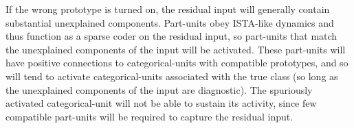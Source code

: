 \documentclass{article} %
\begin{document}


\begin{comment}
If only a single prototype is active (enforced by winner-take-all connections after convergence, as in figure~\ref{categorical_connection_figure}(b)), and all active part-units have orthogonal decoders that are either within or orthogonal to the tangent space (with equal negative connections from the orthogonal units), 
then the weighted sum of negative projections from the part units to the selected categorical-unit is the $\ell_1$ tangent distance.  %
This is actually close to the current network (FINISH).
\end{comment}

If the wrong prototype is turned on, the residual input will generally contain substantial unexplained components.  Part-units obey ISTA-like dynamics and thus function as a sparse coder on the residual input, so part-units that match the unexplained components of the input will be activated.  These part-units will have positive connections to categorical-units with compatible prototypes, and so will tend to activate categorical-units associated with the true class (so long as the unexplained components of the input are diagnostic).  The spuriously activated categorical-unit will not be able to sustain its activity, since few compatible part-units will be required to capture the residual input.  
\end{document}
